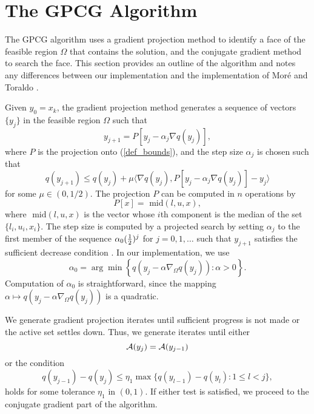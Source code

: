 \section{The GPCG Algorithm}

\label{alg}

The GPCG algorithm uses a gradient projection method
to identify a face of the feasible region $ \Omega $
that contains the solution, and the conjugate gradient
method to search the face.
This section provides an outline of the algorithm and notes any
differences between our implementation and the implementation
of Mor\'e and Toraldo \cite{more-toraldo}.

Given $y_0=x_k$,
the gradient projection method generates a sequence of vectors $\{y_j\}$
in the feasible region $\Omega$ such that
\begin{equation} \label{next-y}
y_{j+1} = P [ y_j - \alpha_j \nabla q(y_j) ],  
\end{equation}
where $P$ is the projection
onto (\ref{def_bounds}), and
the step size $\alpha_j$ is chosen such that
\begin{equation}  \label{gplsstop}
 q(y_{j+1}) \leq q(y_j) + \mu
\langle \nabla q(y_j), P [ y_j - \alpha_j \nabla q(y_j) ] - y_j \rangle
\end{equation}
for some $\mu \in (0, 1/2 )$.
The projection $P$ can be computed in $n$ operations by
\[ 
P[x] = \mbox{ mid} (l,u,x), 
\]
where $\mbox{ mid} (l,u,x)$ is the vector whose $i${th} component
is the median of the set $\{ l_i, u_i, x_i \} $.
The step size is computed by a
projected search \cite{more-toraldo} by setting $ \alpha_j $
to the first member of the sequence
$ \alpha_0 ( \frac{1}{2} ) ^ j $ for $ j = 0, 1, \ldots $ such that
$ y_{j+1} $ satisfies the sufficient decrease condition .
In our implementation, we use
\begin{equation} \label{bqpls}
\alpha_{0}= \arg \min 
\left \{ 
q \left (y_j - \alpha  \nabla_{\Omega} q(y_j) \right ):
\alpha > 0 
\right \} .
\end{equation}
Computation of $ \alpha_0 $ is straightforward, since 
the mapping 
$ \alpha \mapsto 
q \left (y_j - \alpha  \nabla_{\Omega} q(y_j) \right ) $ is
a quadratic.

We generate gradient projection
iterates until sufficient progress is not made or
the active set settles down.
Thus, we generate iterates until either
\begin{equation} 
\label{pgstop1}
 {\cal A}(y_j) = {\cal A}(y_{j-1})
\end{equation}
or the condition
\begin{equation} 
\label{pgstop2}
 q(y_{j-1}) - q(y_j) \leq \eta_1 \max \{q(y_{l-1}) - q(y_l) : 1 \leq l < j \},
\end{equation}
holds for some tolerance $ \eta_1 $ in $ (0,1) $.
If either test is satisfied, we proceed to the
conjugate gradient part of the algorithm.

